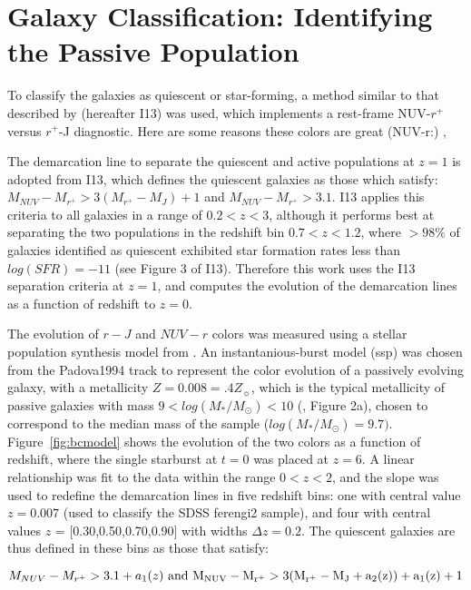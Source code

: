 \section{Galaxy Classification: Identifying the Passive Population}
\label{sec:colorcolor}
To classify the galaxies as quiescent or star-forming, a method similar to that described by \citet{Ilbert2013} (hereafter I13) was used, which implements a rest-frame NUV-$r^{+}$ versus $r^{+}$-J diagnostic. Here are some reasons these colors are great (NUV-r:) \citep{Arnouts2007a,Salim2005a,Wyder2007},\citep{Martin2007}

The demarcation line to separate the quiescent and active populations at $z=1$ is adopted from I13, which defines the quiescent galaxies as those which satisfy: $M_{NUV}-M_{r^{+}} > 3(M_{r^{+}}-M_{J})+1$ and $M_{NUV}-M_{r^{+}} > 3.1$. I13 applies this criteria to all galaxies in a range of $0.2<z<3$, although it performs best at separating the two populations in the redshift bin $0.7<z<1.2$, where $>98\%$ of galaxies identified as quiescent exhibited star formation rates less than $log(SFR) = -11$ (see Figure 3 of I13). Therefore this work uses the I13 separation criteria at $z=1$, and computes the evolution of the demarcation lines as a function of redshift to $z=0$. 

The evolution of $r-J$ and $NUV-r$ colors was measured using a stellar population synthesis model from \citet{Bruzual2003}. An instantanious-burst model (ssp) was chosen from the Padova1994 track to represent the color evolution of a passively evolving galaxy, with a metallicity $Z=0.008=.4Z_{\sun}$, which is the typical metallicity of passive galaxies with mass $9 < log(M_{*}/M_{\odot}) < 10$ (\citet{Peng2015}, Figure 2a), chosen to correspond to the median mass of the sample ($log(M_{*}/M_{\odot})=9.7)$. Figure~\ref{fig:bcmodel} shows the evolution of the two colors as a function of redshift, where the single starburst at $t=0$ was placed at $z=6$. A linear relationship was fit to the data within the range $0<z<2$, and the slope was used to redefine the demarcation lines in five redshift bins: one with central value $z=0.007$ (used to classify the SDSS ferengi2 sample), and four with central values $z$ = [0.30,0.50,0.70,0.90] with widths $\Delta z=0.2$. The quiescent galaxies are thus defined in these bins as those that satisfy:

\begin{equation}
M_{NUV}-M_{r^{+}} > 3.1 + a_{1}(z)
~\rm and~
M_{NUV}-M_{r^{+}} > 3(M_{r^{+}}-M_{J} + a_{2}(z))+ a_{1}(z) + 1  
\end{equation}

